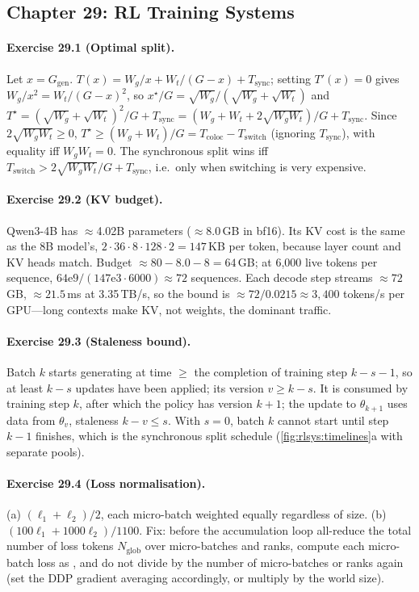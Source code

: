 \subsection*{Chapter 29: RL Training Systems}

\paragraph{Exercise 29.1 (Optimal split).}
Let $x=G_{\text{gen}}$. $T(x)=W_g/x+W_t/(G-x)+T_{\text{sync}}$; setting $T'(x)=0$ gives
$W_g/x^2=W_t/(G-x)^2$, so $x^\star/G=\sqrt{W_g}/(\sqrt{W_g}+\sqrt{W_t})$ and
$T^\star=(\sqrt{W_g}+\sqrt{W_t})^2/G+T_{\text{sync}}=(W_g+W_t+2\sqrt{W_gW_t})/G+T_{\text{sync}}$.
Since $2\sqrt{W_gW_t}\ge0$, $T^\star\ge (W_g+W_t)/G=T_{\text{coloc}}-T_{\text{switch}}$ (ignoring
$T_{\text{sync}}$), with equality iff $W_gW_t=0$. The synchronous split wins iff
$T_{\text{switch}}>2\sqrt{W_gW_t}/G+T_{\text{sync}}$, i.e.\ only when switching is very expensive.

\paragraph{Exercise 29.2 (KV budget).}
Qwen3-4B has $\approx$4.02B parameters ($\approx$8.0\,GB in bf16). Its KV cost is the same as the 8B
model's, $2\cdot36\cdot8\cdot128\cdot2=147$\,KB per token, because layer count and KV heads match.
Budget $\approx 80-8.0-8=64$\,GB; at 6{,}000 live tokens per sequence, $64\text{e}9/(147\text{e}3\cdot
6000)\approx 72$ sequences. Each decode step streams $\approx72$\,GB, $\approx21.5$\,ms at 3.35\,TB/s,
so the bound is $\approx 72/0.0215\approx 3{,}400$ tokens/s per GPU---long contexts make KV, not
weights, the dominant traffic.

\paragraph{Exercise 29.3 (Staleness bound).}
Batch $k$ starts generating at time $\ge$ the completion of training step $k-s-1$, so at least
$k-s$ updates have been applied; its version $v\ge k-s$. It is consumed by training step $k$,
after which the policy has version $k+1$; the update to $\theta_{k+1}$ uses data from $\theta_v$,
staleness $k-v\le s$. With $s=0$, batch $k$ cannot start until step $k-1$ finishes, which is the
synchronous split schedule (\cref{fig:rlsys:timelines}a with separate pools).

\paragraph{Exercise 29.4 (Loss normalisation).}
(a) $(\ell_1+\ell_2)/2$, each micro-batch weighted equally regardless of size. (b)
$(100\ell_1+1000\ell_2)/1100$. Fix: before the accumulation loop all-reduce the total number of
loss tokens $N_{\text{glob}}$ over micro-batches and ranks, compute each micro-batch loss as
, and do not divide by the number of micro-batches or
ranks again (set the DDP gradient averaging accordingly, or multiply by the world size).

